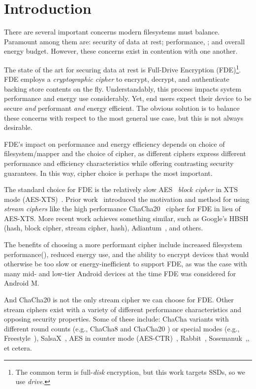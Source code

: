 \section{Introduction}\label{sec:introduction}

There are several important concerns modern filesystems must balance. Paramount
among them are: security of data at rest; performance, ; and overall energy budget. However, these concerns exist in
contention with one another.

The state of the art for securing data at rest is Full-Drive Encryption
(FDE)\footnote{The common term is full-\emph{disk} encryption, but this work
targets SSDs, so we use \emph{drive}.}. FDE employs a \emph{cryptographic
cipher} to encrypt, decrypt, and authenticate backing store contents on the fly.
Understandably, this process impacts system performance and energy use
considerably. Yet, end users expect their device to be secure \emph{and}
performant \emph{and} energy efficient. The obvious solution is to balance these
concerns with respect to the most general use case, but this is not always
desirable. 

FDE's impact on performance and energy efficiency depends on choice of
filesystem/mapper and the choice of cipher, as different ciphers express
different performance and efficiency characteristics while offering contrasting
security guarantees. In this way, cipher choice is perhaps the most important.

The standard choice for FDE is the relatively slow AES~\cite{AES} \emph{block
cipher} in XTS mode (AES-XTS)~\cite{AES-XTS}. Prior work~\cite{StrongBox}
introduced the motivation and method for using \emph{stream ciphers} like the
high performance ChaCha20~\cite{ChaCha20} cipher for FDE in lieu of AES-XTS.
More recent work achieves something similar, such as Google's HBSH~\cite{HBSH}
(hash, block cipher, stream cipher, hash), Adiantum~\cite{Adiantum}, and others.

The benefits of choosing a more performant cipher include increased filesystem
performance(), reduced energy use, and the
ability to encrypt devices that would otherwise be too slow or
energy-inefficient to support FDE, as was the case with many mid- and low-tier
Android devices at the time FDE was considered for Android M.

And ChaCha20 is not the only stream cipher we can choose for FDE. Other stream
ciphers exist with a variety of different performance characteristics and
opposing security properties. Some of these include: ChaCha variants with
different round counts (e.g., ChaCha8 \cite{ChaCha8} and ChaCha20
\cite{ChaCha20}) or special modes (e.g., Freestyle~\cite{Freestyle}),
SalsaX~\cite{SalsaX}, AES in counter mode (AES-CTR)~\cite{AES-CTR},
Rabbit~\cite{Rabbit}, Sosemanuk~\cite{Sosemanuk},, et cetera.

